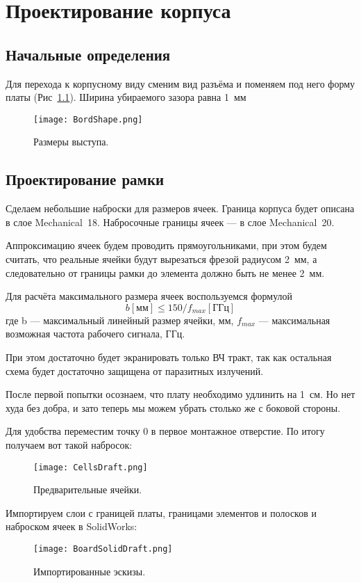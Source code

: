 \chapter{Проектирование корпуса}
\section{Начальные определения}
Для перехода к корпусному виду сменим вид разъёма и поменяем под него форму платы (Рис~\ref{fig:BordShape}). Ширина убираемого зазора равна 1~мм

\begin{figure}[H]
	\centering
	\texttt{[image: BordShape.png]}
	\caption{Размеры выступа.}%
	\label{fig:BordShape}
\end{figure}
\section{Проектирование рамки}
Сделаем небольшие наброски для размеров ячеек. 
Граница корпуса будет описана в слое Mechanical~18. Набросочные границы ячеек — в слое Mechanical~20.

Аппроксимацию ячеек будем проводить прямоугольниками, при этом будем считать, что реальные ячейки будут вырезаться фрезой радиусом 2~мм, а следовательно от границы рамки до элемента должно быть не менее 2~мм.

Для расчёта максимального размера ячеек воспользуемся формулой
\[b[\text{мм}]\leq150/f_{max}[\text{ГГц}]\]
где  b  ---  максимальный  линейный  размер  ячейки,  мм, $f_{max}$ ---  максимальная возможная частота рабочего сигнала, ГГц.

При этом достаточно будет экранировать только ВЧ тракт, так как остальная схема будет достаточно защищена от паразитных излучений.%

После первой попытки осознаем, что плату необходимо удлинить на 1~см. Но нет худа без добра, и зато теперь  мы можем убрать столько же с боковой стороны.

Для удобства переместим точку 0 в первое монтажное отверстие.
По итогу получаем вот такой набросок:
\begin{figure}[H]
	\centering
	\texttt{[image: CellsDraft.png]}
	\caption{Предварительные ячейки.}%
	\label{fig:CellsDraft}
\end{figure}

Импортируем слои с границей платы, границами элементов и полосков и наброском ячеек в SolidWorks:
\begin{figure}[H]
	\centering
	\texttt{[image: BoardSolidDraft.png]}
	\caption{Импортированные эскизы.}%
	\label{fig:BoardSolidDraft}
\end{figure}

